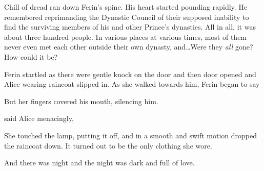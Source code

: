 Chill of dread ran down Ferin's spine. His heart started pounding rapidly. He remembered reprimanding the Dynastic Council of their supposed inability to find the surviving members of his and other Prince's dynasties. All in all, it was about three hundred people. In various places at various times, most of them never even met each other outside their own dynasty, and\dots Were they \textit{all} gone? How could it be?

Ferin startled as there were gentle knock on the door and then door opened and Alice wearing raincoat slipped in. As she walked towards him, Ferin began to say


But her fingers covered his mouth, silencing him.

 said Alice menacingly, 

She touched the lamp, putting it off, and in a smooth and swift motion dropped the raincoat down. It turned out to be the only clothing she wore.

And there was night and the night was dark and full of love.